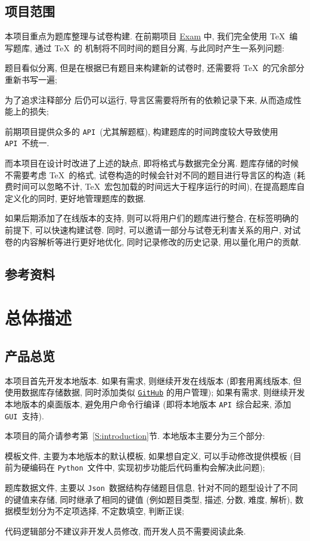 \documentclass{ctexart}
\newcommand{\github}{\texttt{GitHub}}
\newcommand{\python}{\texttt{Python}}
\newcommand{\json}{\texttt{Json}}
\newcommand{\api}{\texttt{API}}
\newcommand{\gui}{\texttt{GUI}}
\begin{document}
\subsection{项目范围}
本项目重点为题库整理与试卷构建. 在前期项目 \href{https://github.com/Iydon/LaTeX_template/tree/master/Exam}{Exam} 中, 我们完全使用 \TeX\ 编写题库, 通过 \TeX\ 的 \verb|| 机制将不同时间的题目分离, 与此同时产生一系列问题:
\begin{enumerate*}[label=\textbf{(\arabic*)}]
    \item 题目看似分离, 但是在根据已有题目来构建新的试卷时, 还需要将 \TeX\ 的冗余部分重新书写一遍;
    \item 为了追求注释部分 \verb|| 后仍可以运行, 导言区需要将所有的依赖记录下来, 从而造成性能上的损失;
    \item 前期项目提供众多的 \api\ (尤其解题框), 构建题库的时间跨度较大导致使用 \api\ 不统一.
\end{enumerate*}

而本项目在设计时改进了上述的缺点, 即将格式与数据完全分离. 题库存储的时候不需要考虑 \TeX\ 的格式, 试卷构造的时候会针对不同的题目进行导言区的构造 (耗费时间可以忽略不计, \TeX\ 宏包加载的时间远大于程序运行的时间), 在提高题库自定义化的同时, 更好地管理题库的数据.

如果后期添加了在线版本的支持, 则可以将用户们的题库进行整合, 在标签明确的前提下, 可以快速构建试卷. 同时, 可以邀请一部分与试卷无利害关系的用户, 对试卷的内容解析等进行更好地优化, 同时记录修改的历史记录, 用以量化用户的贡献.


\subsection{参考资料}
\printbibliography[heading=none]



\section{总体描述}\label{S:overall-description}
\subsection{产品总览}
本项目首先开发本地版本. 如果有需求, 则继续开发在线版本 (即套用离线版本, 但使用数据库存储数据, 同时添加类似 \href{https://github.com/Iydon}{\github} 的用户管理); 如果有需求, 则继续开发本地版本的桌面版本, 避免用户命令行编译 (即将本地版本 \api\ 综合起来, 添加 \gui\ 支持).

本项目的简介请参考第~\ref{S:introduction}节. 本地版本主要分为三个部分: \begin{enumerate*}[label=\textbf{(\arabic*)}]
    \item 模板文件, 主要为本地版本的默认模板, 如果想自定义, 可以手动修改提供模板 (目前为硬编码在 \python\ 文件中, 实现初步功能后代码重构会解决此问题);
    \item 题库数据文件, 主要以 \json\ 数据结构存储题目信息, 针对不同的题型设计了不同的键值来存储, 同时继承了相同的键值 (例如题目类型, 描述, 分数, 难度, 解析), 数据模型划分为不定项选择, 不定数填空, 判断正误;
    \item 代码逻辑部分不建议非开发人员修改, 而开发人员不需要阅读此条.
\end{enumerate*}
\end{document}
